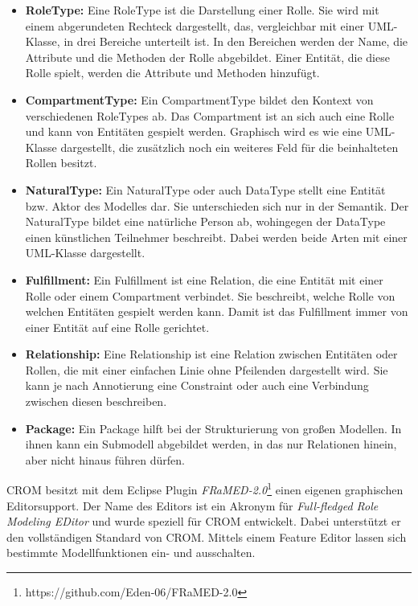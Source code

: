 \begin{itemize}
    \item \textbf{RoleType:}
    Eine RoleType ist die Darstellung einer Rolle.
    Sie wird mit einem abgerundeten Rechteck dargestellt, das, vergleichbar mit einer UML-Klasse, in drei Bereiche unterteilt ist.
    In den Bereichen werden der Name, die Attribute und die Methoden der Rolle abgebildet.
    Einer Entität, die diese Rolle spielt, werden die Attribute und Methoden hinzufügt.
    \item \textbf{CompartmentType:}
    Ein CompartmentType bildet den Kontext von verschiedenen RoleTypes ab.
    Das Compartment ist an sich auch eine Rolle und kann von Entitäten gespielt werden.
    Graphisch wird es wie eine UML-Klasse dargestellt, die zusätzlich noch ein weiteres Feld für die beinhalteten Rollen besitzt.
    \item \textbf{NaturalType:}
    Ein NaturalType oder auch DataType stellt eine Entität bzw. Aktor des Modelles dar.
    Sie unterschieden sich nur in der Semantik.
    Der NaturalType bildet eine natürliche Person ab, wohingegen der DataType einen künstlichen Teilnehmer beschreibt.
    Dabei werden beide Arten mit einer UML-Klasse dargestellt. 
    \item \textbf{Fulfillment:}
    Ein Fulfillment ist eine Relation, die eine Entität mit einer Rolle oder einem Compartment verbindet.
    Sie beschreibt, welche Rolle von welchen Entitäten gespielt werden kann.
    Damit ist das Fulfillment immer von einer Entität auf eine Rolle gerichtet.
    \item \textbf{Relationship:}
    Eine Relationship ist eine Relation zwischen Entitäten oder Rollen, die mit einer einfachen Linie ohne Pfeilenden dargestellt wird.
    Sie kann je nach Annotierung eine Constraint oder auch eine Verbindung zwischen diesen beschreiben.
    \item \textbf{Package:}
    Ein Package hilft bei der Strukturierung von großen Modellen.
    In ihnen kann ein Submodell abgebildet werden, in das nur Relationen hinein, aber nicht hinaus führen dürfen.
\end{itemize}

CROM besitzt mit dem Eclipse Plugin \emph{FRaMED-2.0}\footnote{https://github.com/Eden-06/FRaMED-2.0} einen eigenen graphischen Editorsupport.
Der Name des Editors ist ein Akronym für \emph{Full-fledged Role Modeling EDitor} und wurde speziell für CROM entwickelt.
Dabei unterstützt er den vollständigen Standard von CROM.
Mittels einem Feature Editor lassen sich bestimmte Modellfunktionen ein- und ausschalten.

